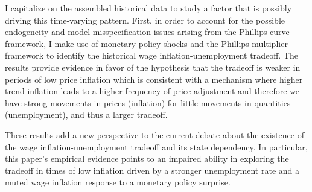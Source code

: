 \documentclass[12pt]{article}
\begin{document}
I capitalize on the assembled historical data to study a factor that is possibly driving this time-varying pattern. First, in order to account for the possible endogeneity and model misspecification issues arising from the Phillips curve framework, I make use of monetary policy shocks and the Phillips multiplier framework to identify the historical wage inflation-unemployment tradeoff. The results provide evidence in favor of the hypothesis that the tradeoff is weaker in periods of low price inflation which is consistent with a mechanism where higher trend inflation leads to a higher frequency of price adjustment and therefore we have strong movements in prices (inflation) for little movements in quantities (unemployment), and thus a larger tradeoff.

These results add a new perspective to the current debate about the existence of the wage inflation-unemployment tradeoff and its state dependency. In particular, this paper's empirical evidence points to an impaired ability in exploring the tradeoff in times of low inflation driven by a stronger unemployment rate and a muted wage inflation response to a monetary policy surprise. 


\clearpage

\begin{singlespace}

   
\end{singlespace}


\clearpage
\end{document}
